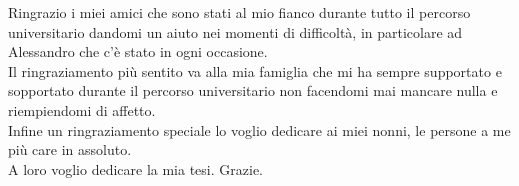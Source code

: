 \documentclass[a4paper,11pt,twoside,openright]{report}
\begin{document}
Ringrazio i miei amici che sono stati al mio fianco durante tutto il percorso universitario dandomi un aiuto nei momenti di difficoltà, in particolare ad Alessandro che c'è stato in ogni occasione.\\

Il ringraziamento più sentito va alla mia famiglia che mi ha sempre supportato e sopportato durante il percorso universitario non facendomi mai mancare nulla e riempiendomi di affetto.\\

Infine un ringraziamento speciale lo voglio dedicare ai miei nonni, le persone a me più care in assoluto.\\

A loro voglio dedicare la mia tesi. Grazie.\\






\end{document}
